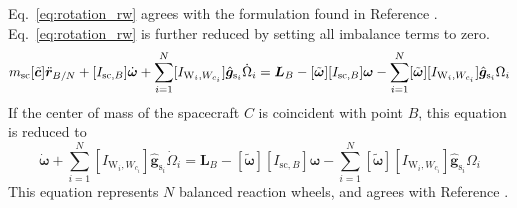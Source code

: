 Eq.~\eqref{eq:rotation_rw} agrees with the formulation found in Reference \cite{Alcorn:2016Jitter}. Eq.~\eqref{eq:rotation_rw} is further reduced by setting all imbalance terms to zero.
\begin{equation}
	m_{\text{\text{sc}}}[\tilde{\bm{c}}]\ddot{\bm r}_{B/N} + [I_{\text{sc},B}]\dot{\bm\omega}
	+\sum\limits_{i=1}^{N} [I_{\text{W}_i,W_{c_i}}]\hat{\bm{g}}_{\text{s}_i} \dot{\Omega}_i
	= \bm{L}_B - [\tilde{\bm\omega}][I_{\text{sc},B}]\bm\omega
	-\sum\limits_{i=1}^{N}[\tilde{\bm{\omega}}][I_{\text{W}_i,W_{c_i}}]\hat{\bm g}_{\text{s}_i}\Omega_i
	\label{eq:rwRotationSimple}
\end{equation}
If the center of mass of the spacecraft $C$ is coincident with point $B$, this equation is reduced to
\begin{equation}
	[I_{\text{sc},B}]\dot{\bm\omega}
	+\sum\limits_{i=1}^{N} [I_{\text{W}_i,W_{c_i}}]\hat{\bm{g}}_{\text{s}_i} \dot{\Omega}_i
	= \bm{L}_B - [\tilde{\bm\omega}][I_{\text{sc},B}]\bm\omega
	-\sum\limits_{i=1}^{N}[\tilde{\bm{\omega}}][I_{\text{W}_i,W_{c_i}}]\hat{\bm g}_{\text{s}_i}\Omega_i
	\label{eq:rwRotationSimple_noCoffset}
\end{equation}
This equation represents $N$ balanced reaction wheels, and agrees with Reference \cite{schaub}.

